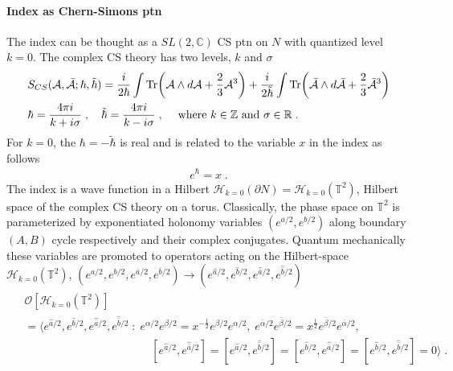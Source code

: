 \documentclass[a4paper,11pt]{article}
\def\cA{\mathcal{A}}
\def\cH{\mathcal{H}}
\begin{document}
\paragraph{Index as Chern-Simons ptn} The index can be thought as a $SL(2,\mathbb{C})$ CS ptn on $N$ with quantized level $k=0$. The complex CS theory has two levels, $k$ and $\sigma$
%
\begin{align}
\begin{split}
&S_{CS}(\cA, \bar{\cA}; \hbar , \tilde{\hbar}) = \frac{i}{2\hbar} \int \textrm{Tr}\bigg{(} \cA \wedge d \cA  + \frac{2}3 \cA^3 \bigg{)} +  \frac{i}{2\tilde{\hbar}} \int \textrm{Tr} \bigg{(} \bar{\cA} \wedge d \bar{\cA}  + \frac{2}3 \bar{\cA}^3 \bigg{)}
\\
& \hbar = \frac{4\pi i }{k +i \sigma}\;, \quad  \tilde{\hbar} = \frac{4\pi i }{k -i  \sigma} \;,\;\quad  \textrm{where }k \in \mathbb{Z} \textrm{ and } \sigma \in \mathbb{R}\;.
\end{split}
\end{align}
%
For $k=0$, the $\hbar = - \tilde{\hbar}$ is real and is related to the variable $x$ in the index as follows
%
\begin{align}
e^{\hbar} = x\;.
\end{align}
%
The index is a wave function in a Hilbert $\cH_{k=0}(\partial N) = \cH_{k=0}(\mathbb{T}^2)$, Hilbert space of the complex CS theory on a torus. Classically, the phase space on $\mathbb{T}^2$ is parameterized by exponentiated holonomy variables $( e^{a/2} , e^{b/2})$ along boundary $(A,B)$ cycle respectively and their complex conjugates. 
Quantum mechanically these variables are promoted to operators acting on the Hilbert-space $\cH_{k=0}(\mathbb{T}^2)$, $(e^{a/2},e^{b/2},e^{\bar{a}/2},e^{\bar{b}/2}) \rightarrow (e^{\hat{a}/2},e^{\hat{b}/2},e^{\hat{\bar{a}}/2},e^{\hat{\bar{b}}/2}) $
%
\begin{align}
\begin{split}
&\mathcal{O} [\cH_{k=0} (\mathbb{T}^2)] 
\\
&= \langle e^{\hat{a}/2}, e^{\hat{b}/2}, e^{\hat{\bar{a}}/2}, e^{\hat{\bar{b}}/2} \; :\; e^{\alpha/2} e^{\beta/2} = x^{-\frac{1}2} e^{\beta/2} e^{\alpha/2},\; e^{\bar{\alpha}/2} e^{\bar{\beta}/2} = x^{\frac{1}2} e^{\bar{\beta}/2} e^{\bar{\alpha}/2},
\\
&\qquad \qquad \qquad \qquad \qquad \quad  \;[e^{\hat{a}/2}, e^{\hat{\bar{a}}/2}] = [e^{\hat{a}/2}, e^{\hat{\bar{b}}/2}] =[e^{\hat{b}/2}, e^{\hat{\bar{a}}/2}] = [e^{\hat{b}/2}, e^{\hat{\bar{b}}/2}]= 0 \rangle\;.
\end{split}
\end{align}
\end{document}
